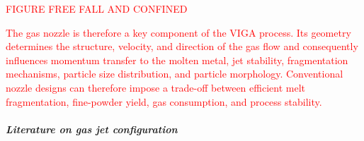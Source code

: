 \documentclass[../../../main.tex]{subfiles}
\begin{document}
\textcolor{red}{FIGURE FREE FALL AND CONFINED}

%         

\textcolor{red}{
The gas nozzle is therefore a key component of the VIGA process. Its geometry determines the structure, velocity, and direction of the gas flow and consequently influences momentum transfer to the molten metal, jet stability, fragmentation mechanisms, particle size distribution, and particle morphology. Conventional nozzle designs can therefore impose a trade-off between efficient melt fragmentation, fine-powder yield, gas consumption, and process stability.}


\subparagraph{Literature on gas jet configuration}
\end{document}
